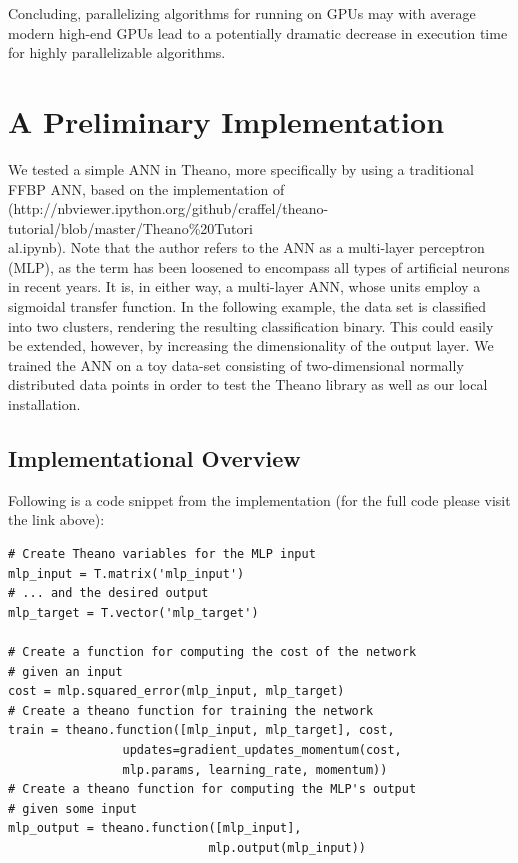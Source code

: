 Concluding, parallelizing algorithms for running on GPUs may with average modern high-end GPUs lead to a potentially dramatic decrease in execution time for highly parallelizable algorithms.

\section{A Preliminary Implementation}

We tested a simple ANN in Theano, more specifically by using a traditional FFBP ANN, based on the implementation of
\\(http://nbviewer.ipython.org/github/craffel/theano-tutorial/blob/master/Theano\%20Tutori
\\al.ipynb). Note that the author refers to the ANN as a multi-layer perceptron (MLP), as the term has been loosened to encompass all types of artificial neurons in recent years. It is, in either way, a multi-layer ANN, whose units employ a sigmoidal transfer function. In the following example, the data set is classified into two clusters, rendering the resulting classification binary. This could easily be extended, however, by increasing the dimensionality of the output layer. We trained the ANN on a toy data-set consisting of two-dimensional normally distributed data points in order to test the Theano library as well as our local installation.


\subsection{Implementational Overview}

Following is a code snippet from the implementation (for the full code please visit the link above):

\begin{verbatim}
# Create Theano variables for the MLP input
mlp_input = T.matrix('mlp_input')
# ... and the desired output
mlp_target = T.vector('mlp_target')

# Create a function for computing the cost of the network 
# given an input
cost = mlp.squared_error(mlp_input, mlp_target)
# Create a theano function for training the network
train = theano.function([mlp_input, mlp_target], cost,
                updates=gradient_updates_momentum(cost,
                mlp.params, learning_rate, momentum))
# Create a theano function for computing the MLP's output 
# given some input
mlp_output = theano.function([mlp_input], 
                            mlp.output(mlp_input))
\end{verbatim}

